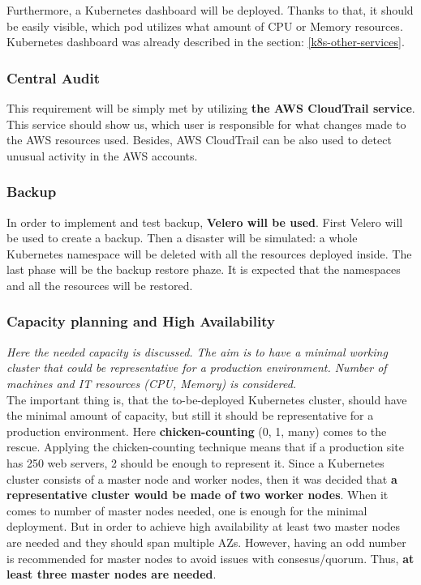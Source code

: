 Furthermore, a Kubernetes dashboard will be deployed. Thanks to that, it should be easily visible, which pod utilizes what amount of CPU or Memory resources. Kubernetes dashboard was already described in the section: \ref{k8s-other-services}.

\subsubsection{Central Audit}

This requirement will be simply met by utilizing \textbf{the AWS CloudTrail service}. This service should show us, which user is responsible for what changes made to the AWS resources used. Besides, AWS CloudTrail can be also used to detect unusual activity in the AWS accounts\cite{online-ct}.

\subsubsection{Backup}

In order to implement and test backup, \textbf{Velero will be used}. First Velero will be used to create a backup. Then a disaster will be simulated: a whole Kubernetes namespace will be deleted with all the resources deployed inside. The last phase will be the backup restore phaze. It is expected that the namespaces and all the resources will be restored\cite{eksworkshop-backup}.


\subsubsection{Capacity planning and High Availability}
\textit{Here the needed capacity is discussed. The aim is to have a minimal working cluster that could be representative for a production environment. Number of machines and IT resources (CPU, Memory) is considered.}
\\

The important thing is, that the to-be-deployed Kubernetes cluster, should have the minimal amount of capacity, but still it should be representative for a production environment. Here \textbf{chicken-counting} (0, 1, many) comes to the rescue. Applying the chicken-counting technique means that if a production site has 250 web servers, 2 should be enough to represent it\cite{book-cicd}. Since a Kubernetes cluster consists of a master node and worker nodes, then it was decided that \textbf{a representative cluster would be made of two worker nodes}. When it comes to number of master nodes needed, one is enough for the minimal deployment. But in order to achieve high availability at least two master nodes are needed and they should span multiple AZs\cite{article-aws-architecting}. However, having an odd number is recommended for master nodes to avoid issues with consesus/quorum. Thus, \textbf{at least three master nodes are needed}\cite{online-ha-k8s-blog}.

